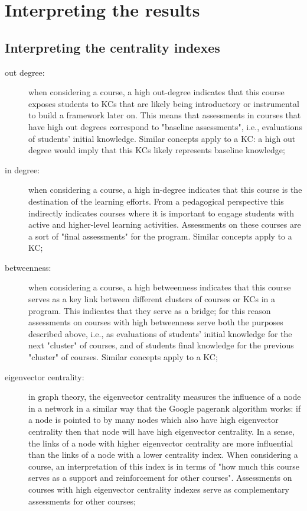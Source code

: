 \section{Interpreting the results}
\label{sec:interpreting_the_results}

\subsection{Interpreting the centrality indexes}

\begin{description}

	\item[out degree:] when considering a course, a high out-degree
		indicates that this course exposes students to \acp{KC} that
		are likely being introductory or instrumental to build a
		framework later on. This means that assessments in courses
		that have high out degrees correspond to "baseline
		assessments", i.e., evaluations of students' initial
		knowledge. Similar concepts apply to a \ac{KC}: a high out
		degree would imply that this \acp{KC} likely represents
		baseline knowledge;

	\item[in degree:] when considering a course, a high in-degree
		indicates that this course is the destination of the
		learning efforts. From a pedagogical perspective this
		indirectly indicates courses where it is important to engage
		students with active and higher-level learning activities.
		Assessments on these courses are a sort of "final
		assessments" for the program. Similar concepts apply to a
		\ac{KC};

	\item[betweenness:] when considering a course, a high betweenness
		indicates that this course serves as a key link between
		different clusters of courses or \acp{KC} in a program. This
		indicates that they serve as a bridge; for this reason
		assessments on courses with high betweenness serve both the
		purposes described above, i.e., as evaluations of students'
		initial knowledge for the next "cluster" of courses, and of
		students final knowledge for the previous "cluster" of
		courses. Similar concepts apply to a \ac{KC};

	\item[eigenvector centrality:] in graph theory, the eigenvector
		centrality measures the influence of a node in a network in
		a similar way that the Google pagerank algorithm works: if a
		node is pointed to by many nodes which also have high
		eigenvector centrality then that node will have high
		eigenvector centrality. In a sense, the links of a node with
		higher eigenvector centrality are more influential than the
		links of a node with a lower centrality index. When
		considering a course, an interpretation of this index is in
		terms of "how much this course serves as a support and
		reinforcement for other courses". Assessments on courses
		with high eigenvector centrality indexes serve as
		complementary assessments for other courses;


\end{description}
